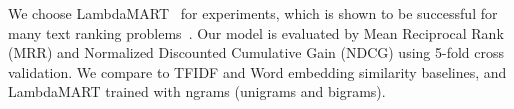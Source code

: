 
We choose LambdaMART~\cite{burges2010ranknet} for experiments, which is shown to be successful for many text ranking problems~\cite{chapelle2011yahoo}. Our model is evaluated by Mean Reciprocal Rank (MRR) and Normalized Discounted Cumulative Gain (NDCG) using 5-fold cross validation. We compare to TFIDF and Word embedding similarity baselines, and LambdaMART trained with ngrams (unigrams and bigrams). 


